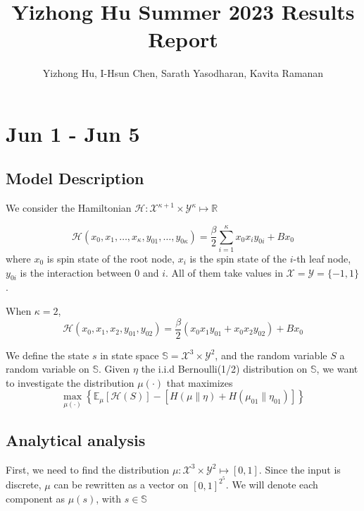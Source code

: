 \documentclass[12pt]{article}
\numberwithin{equation}{section}
\begin{document}
\title{Yizhong Hu Summer 2023 Results Report}
\author{Yizhong Hu, I-Hsun Chen, Sarath Yasodharan, Kavita Ramanan}
\maketitle

\section{Jun 1 - Jun 5}

\subsection{Model Description}

We consider the Hamiltonian $\mathcal{H}: \mathcal{X}^{\kappa + 1} \times \mathcal{Y}^{\kappa} \mapsto \mathbb{R}$

\begin{equation*}
    \mathcal{H}(x_0, x_1, \ldots, x_\kappa, y_{01}, \ldots, y_{0\kappa} ) = \frac{\beta}{2}\sum_{i=1}^\kappa x_0x_iy_{0i} + Bx_0
\end{equation*}
where $x_0$ is spin state of the root node, $x_i$ is the spin state of the $i$-th leaf node, $y_{0i}$ is the interaction between
$0$ and $i$. All of them take values in $\mathcal{X} = \mathcal{Y} = \{-1, 1\}$.

When $\kappa=2$,
\begin{equation*}
    \mathcal{H}(x_0, x_1, x_2, y_{01}, y_{02} ) = \frac{\beta}{2}(x_0x_1y_{01} + x_0x_2y_{02}) + Bx_0
\end{equation*}

We define the state $s$ in state space $\mathbb{S} = \mathcal{X}^3 \times \mathcal{Y}^2$, and the random variable $S$ a random variable
on $\mathbb{S}$. Given $\eta$ the i.i.d Bernoulli(1/2) distribution on $\mathbb{S}$, we want to investigate the distribution $\mu(\cdot)$ that maximizes
\begin{equation*}
    \max_{\mu(\cdot)} \left\{\mathbb{E}_\mu[\mathcal{H}(S)] - \left[H(\mu \| \eta) + H(\mu_{01}\|\eta_{01} )\right]\right\}
\end{equation*}

\subsection{Analytical analysis}

First, we need to find the distribution $\mu: \mathcal{X}^3 \times \mathcal{Y}^2 \mapsto [0, 1]$. Since the input is discrete,
$\mu$ can be rewritten as a vector on $[0, 1]^{2^5}$. We will denote each component as $\mu(s)$, with $s\in \mathbb{S}$
\end{document}
